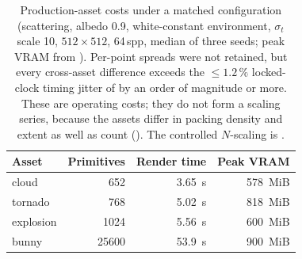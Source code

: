 \begin{table}[htp]
  \centering
  \begin{tabular}{@{}lrrr@{}}
    \toprule
    Asset & Primitives & Render time & Peak VRAM \\
    \midrule
    cloud     & \num{652}   & \SI{3.65}{\second}  & \SI{578}{MiB} \\
    tornado   & \num{768}   & \SI{5.02}{\second}  & \SI{818}{MiB} \\
    explosion & \num{1024}  & \SI{5.56}{\second}  & \SI{600}{MiB} \\
    bunny     & \num{25600} & \SI{53.9}{\second}  & \SI{900}{MiB} \\
    \bottomrule
  \end{tabular}
  \caption{Production-asset costs under a matched configuration (scattering, albedo \num{0.9},
  white-constant environment, \(\sigma_t\) scale \num{10}, \(512\times512\), \num{64}\,spp, median of three
seeds; peak VRAM from ). Per-point spreads were not retained, but every
cross-asset difference exceeds the ${\le}\num{1.2}\,\%$ locked-clock timing jitter of
 by an order of magnitude or more. These are operating costs; they
do not form a scaling series, because the assets differ in packing density and extent as
well as count (). The controlled \(N\)-scaling is .}
  \label{tab:asset-cost}
\end{table}


